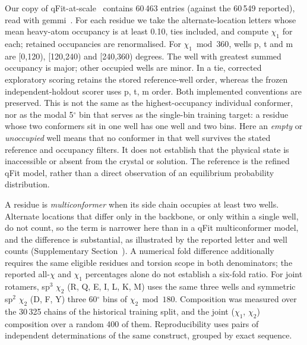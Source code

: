 \documentclass[10pt,twocolumn,a4paper]{article}
\begin{document}
Our copy of qFit-at-scale~\citep{wankowicz2026qfitatscale} contains 60\,463 entries
(against the 60\,549 reported), read with gemmi~\citep{wojdyr2022gemmi}. For each
residue we take the alternate-location letters whose mean heavy-atom occupancy is at
least 0.10, ties included, and compute $\chi_1$ for each; retained occupancies are
renormalised. For $\chi_1\bmod 360$, wells p, t and m are [0,120), [120,240) and
[240,360) degrees. The well with greatest summed occupancy is major; other occupied wells are minor. In a tie, corrected exploratory scoring retains the stored reference-well order, whereas the frozen independent-holdout scorer uses p, t, m order. Both implemented conventions are preserved. This is not the same as the
highest-occupancy individual conformer, nor as the modal 5$^\circ$ bin that serves as
the single-bin training target: a residue whose two conformers sit in one well has one
well and two bins. Here an \emph{empty} or \emph{unoccupied} well means that no
conformer in that well survives the stated reference and occupancy filters. It does not
establish that the physical state is inaccessible or absent from the crystal or solution.
The reference is the refined qFit model, rather than a direct observation of an
equilibrium probability distribution.

A residue is \emph{multiconformer} when its side chain occupies at least two wells.
Alternate locations that differ only in the backbone, or only within a single well, do
not count, so the term is narrower here than in a qFit multiconformer model, and the
difference is substantial, as illustrated by the reported letter and well counts
(Supplementary Section~). A numerical fold difference additionally requires
the same eligible residues and torsion scope in both denominators; the reported
all-$\chi$ and $\chi_1$ percentages alone do not establish a six-fold ratio. For joint rotamers, sp$^3$ $\chi_2$ (R, Q, E, I,
L, K, M) uses the same three wells and symmetric sp$^2$ $\chi_2$ (D, F, Y) three
60$^\circ$ bins of $\chi_2\bmod 180$. Composition was measured over the 30\,325 chains
of the historical training split, and the joint ($\chi_1$, $\chi_2$) composition over a random 400
of them. Reproducibility uses pairs of independent determinations of the same
construct, grouped by exact sequence.
\end{document}
